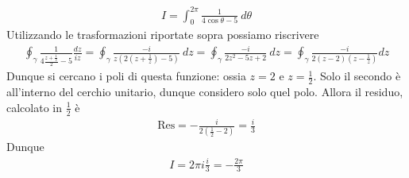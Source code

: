 \documentclass[a4paper, oneside]{article}
\begin{document}
\begin{example}
    \begin{gather*}
        I = \int_{0}^{2\pi} \frac{1}{4\cos\theta - 5} \ d\theta  
    \end{gather*}
    Utilizzando le trasformazioni riportate sopra possiamo riscrivere 
    \begin{gather*}
        \oint _{\gamma} \frac{1}{4\frac{z + \frac{1}{z}}{2} - 5} \frac{dz}{iz} = \oint_{\gamma} \frac{-i}{z(2(z + \frac{1}{z}) - 5)} \ dz = \oint_{\gamma} \frac{-i}{2z^{2} - 5z + 2} \ dz = \oint_{\gamma} \frac{-i}{2(z - 2)(z - \frac{1}{z})}dz
    \end{gather*}
    Dunque si cercano i poli di questa funzione: ossia $z = 2$ e $z = \frac{1}{2}$. Solo il secondo è 
    all'interno del cerchio unitario, dunque considero solo quel polo. Allora 
    il residuo, calcolato in $\frac{1}{2}$ è 
    \begin{gather*}
        \text{Res} = - \frac{i}{2(\frac{1}{2} - 2)} = \frac{i}{3}
    \end{gather*}
    Dunque
    \begin{gather*}
        I = 2\pi i \frac{i}{3} = - \frac{2\pi}{3}
    \end{gather*}
\end{example}
\end{document}
